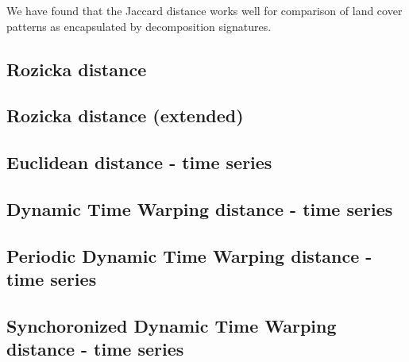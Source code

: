\noindent We have found that the Jaccard distance works well for comparison of land cover patterns as encapsulated by decomposition signatures.

\subsection{Rozicka distance}

\subsection{Rozicka distance (extended)}

\subsection{Euclidean distance - time series}

\subsection{Dynamic Time Warping distance - time series}

\subsection{Periodic Dynamic Time Warping distance - time series}

\subsection{Synchoronized Dynamic Time Warping distance - time series}